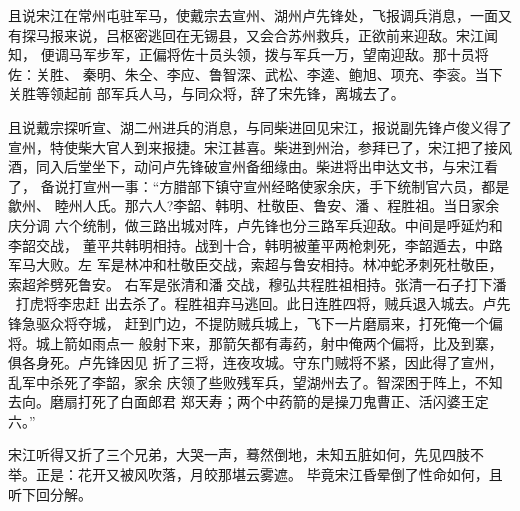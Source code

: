 且说宋江在常州屯驻军马，使戴宗去宣州、湖州卢先锋处，飞报调兵消息，一面又
有探马报来说，吕枢密逃回在无锡县，又会合苏州救兵，正欲前来迎敌。宋江闻知，
便调马军步军，正偏将佐十员头领，拨与军兵一万，望南迎敌。那十员将佐：关胜、
秦明、朱仝、李应、鲁智深、武松、李逵、鲍旭、项充、李衮。当下关胜等领起前
部军兵人马，与同众将，辞了宋先锋，离城去了。

且说戴宗探听宣、湖二州进兵的消息，与同柴进回见宋江，报说副先锋卢俊义得了
宣州，特使柴大官人到来报捷。宋江甚喜。柴进到州治，参拜已了，宋江把了接风
酒，同入后堂坐下，动问卢先锋破宣州备细缘由。柴进将出申达文书，与宋江看了，
备说打宣州一事：“方腊部下镇守宣州经略使家余庆，手下统制官六员，都是歙州、
睦州人氏。那六人?李韶、韩明、杜敬臣、鲁安、潘、程胜祖。当日家余庆分调
六个统制，做三路出城对阵，卢先锋也分三路军兵迎敌。中间是呼延灼和李韶交战，
董平共韩明相持。战到十合，韩明被董平两枪刺死，李韶遁去，中路军马大败。左
军是林冲和杜敬臣交战，索超与鲁安相持。林冲蛇矛刺死杜敬臣，索超斧劈死鲁安。
右军是张清和潘交战，穆弘共程胜祖相持。张清一石子打下潘，打虎将李忠赶
出去杀了。程胜祖弃马逃回。此日连胜四将，贼兵退入城去。卢先锋急驱众将夺城，
赶到门边，不提防贼兵城上，飞下一片磨扇来，打死俺一个偏将。城上箭如雨点一
般射下来，那箭矢都有毒药，射中俺两个偏将，比及到寨，俱各身死。卢先锋因见
折了三将，连夜攻城。守东门贼将不紧，因此得了宣州，乱军中杀死了李韶，家余
庆领了些败残军兵，望湖州去了。智深困于阵上，不知去向。磨扇打死了白面郎君
郑天寿；两个中药箭的是操刀鬼曹正、活闪婆王定六。”

宋江听得又折了三个兄弟，大哭一声，蓦然倒地，未知五脏如何，先见四肢不
举。正是：花开又被风吹落，月皎那堪云雾遮。
毕竟宋江昏晕倒了性命如何，且听下回分解。